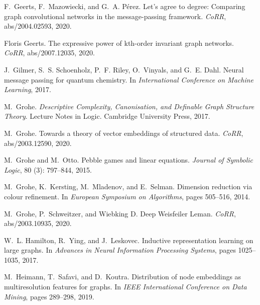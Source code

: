 \documentclass{article}
\theoremstyle{definition}
\begin{document}
\begin{thebibliography}{125}
	F.~Geerts, F.~Mazowiecki, and G.~A. P{\'{e}}rez.
	\newblock Let's agree to degree: Comparing graph convolutional networks in the
	message-passing framework.
	\newblock \emph{CoRR}, abs/2004.02593, 2020.
	
	Floris Geerts.
	\newblock The expressive power of kth-order invariant graph networks.
	\newblock \emph{CoRR}, abs/2007.12035, 2020.
	
	J.~Gilmer, S.~S. Schoenholz, P.~F. Riley, O.~Vinyals, and G.~E. Dahl.
	\newblock Neural message passing for quantum chemistry.
	\newblock In \emph{International Conference on Machine Learning}, 2017.
	
	M.~Grohe.
	\newblock \emph{Descriptive Complexity, Canonisation, and Definable Graph
		Structure Theory}.
	\newblock Lecture Notes in Logic. Cambridge University Press, 2017.
	
	M.~Grohe.
	 {T}owards a theory of vector
	embeddings of structured data.
	\newblock \emph{CoRR}, abs/2003.12590, 2020.
	
	M.~Grohe and M.~Otto.
	\newblock Pebble games and linear equations.
	\newblock \emph{Journal of Symbolic Logic}, 80 (3): 797--844,
	2015.
	
	M.~Grohe, K.~Kersting, M.~Mladenov, and E.~Selman.
	\newblock Dimension reduction via colour refinement.
	\newblock In \emph{European Symposium on Algorithms}, pages 505--516, 2014.
	
	M.~Grohe, P.~Schweitzer, and Wiebking D.
	\newblock Deep {Weisfeiler Leman}.
	\newblock \emph{CoRR}, abs/2003.10935, 2020.
	
	W.~L. Hamilton, R.~Ying, and J.~Leskovec.
	\newblock Inductive representation learning on large graphs.
	\newblock In \emph{Advances in Neural Information Processing Systems}, pages
	1025--1035, 2017.
	
	M.~Heimann, T.~Safavi, and D.~Koutra.
	\newblock Distribution of node embeddings as multiresolution features for
	graphs.
	\newblock In \emph{{IEEE} International Conference on Data Mining}, pages
	289--298, 2019.
	

\end{thebibliography}
\end{document}
